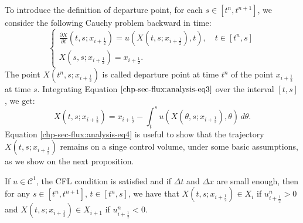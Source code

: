 To introduce the definition of departure point, for each $s \in [t^n,t^{n+1}]$,
we consider the following Cauchy problem backward in time:
\begin{equation}
	\label{chp-sec-flux:analysis-eq3}
    	\begin{cases}
				\frac{\partial X}{\partial t} (t,s;x_{i+\frac{1}{2}}) = u(X(t,s;x_{i+\frac{1}{2}}) ,t),\quad t\in[t^{n},s] \\
				X(s,s;x_{i+\frac{1}{2}}) = x_{i+\frac{1}{2}}.
    	\end{cases}
\end{equation}
The point $X(t^n,s;x_{i+\frac{1}{2}})$ is called departure point at time $t^n$
of the point $x_{i+\frac{1}{2}}$ at time $s$.
Integrating Equation $\eqref{chp-sec-flux:analysis-eq3}$ over the interval
$[t,s]$, we get:
\begin{equation}
	\label{chp-sec-flux:analysis-eq4}
	X(t,s;x_{i+\frac{1}{2}}) = x_{i+\frac{1}{2}} - \int_{t}^{s}u(X(\theta,s;x_{i+\frac{1}{2}}),\theta) \,d\theta.
\end{equation}
Equation \eqref{chp-sec-flux:analysis-eq4} is useful to show that the trajectory $X(t,s;x_{i+\frac{1}{2}})$ remains on a singe control volume,
under some basic assumptions, as we show on the next proposition.
\begin{prop}
	\label{chp2-sec-flux:departurebound}
	If $u \in \mathcal{C}^1$, the CFL condition is satisfied and if $\Delta t$ and $\Delta x$ are small enough, then
	for any $s \in [t^n, t^{n+1}]$, $t \in [t^n, s]$, we have that $X(t,s;x_{i+\frac{1}{2}}) \in X_i$ if $u_{i+\frac{1}{2}}^n>0$ 
	and	$X(t,s;x_{i+\frac{1}{2}}) \in X_{i+1}$ if $u_{i+\frac{1}{2}}^n<0$.
\end{prop}


